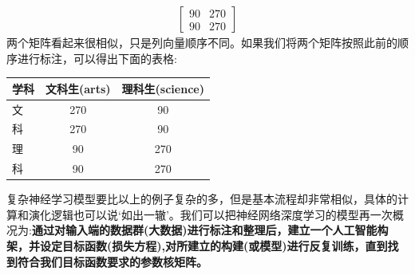 \documentclass[12pt]{article}
\numberwithin{equation}{section}
\numberwithin{figure}{section}
\begin{document}
\begin{example}
\begin{align*}
\begin{bmatrix}
		90 & 270 \\
		90 & 270 
	\end{bmatrix}
\end{align*}
两个矩阵看起来很相似，只是列向量顺序不同。如果我们将两个矩阵按照此前的顺序进行标注，可以得出下面的表格:
\begin{table}[H]
\renewcommand{\arraystretch}{1.2}
	\centering
	\begin{tabular}{|l|cc|}
	\hline 
		学科 & 文科生(arts) & 理科生(science) \\
		\hline 
		文& 270 & 90 \\
		科& 270 & 90 \\
		\hline 
		理& 90 & 270 \\
		科& 90 & 270 \\
		\hline 
	\end{tabular}
\end{table}
\end{example}

复杂神经学习模型要比以上的例子复杂的多，但是基本流程却非常相似，具体的计算和演化逻辑也可以说`如出一辙'。我们可以把神经网络深度学习的模型再一次概况为:\textbf{通过对输入端的数据群(大数据)进行标注和整理后，建立一个人工智能构架，并设定目标函数(损失方程),对所建立的构建(或模型)进行反复训练，直到找到符合我们目标函数要求的参数核矩阵。}
\end{document}
